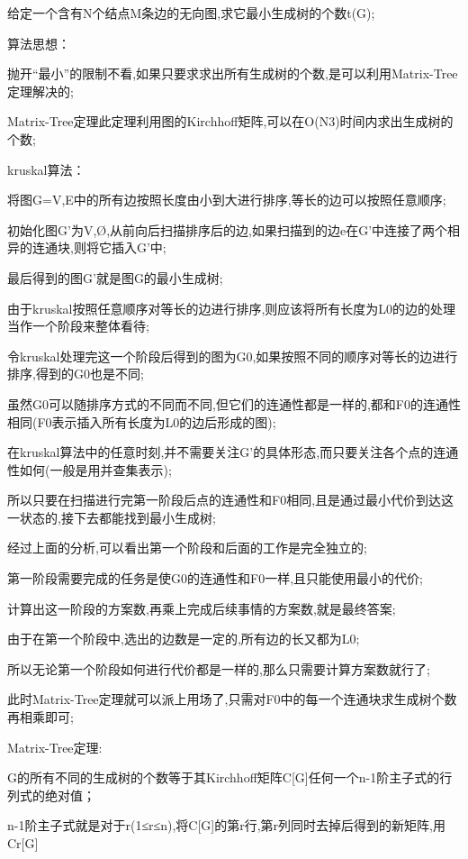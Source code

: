 给定一个含有N个结点M条边的无向图,求它最小生成树的个数t(G);

算法思想：

抛开“最小”的限制不看,如果只要求求出所有生成树的个数,是可以利用Matrix-Tree定理解决的;

Matrix-Tree定理此定理利用图的Kirchhoff矩阵,可以在O(N3)时间内求出生成树的个数;

kruskal算法：

将图G={V,E}中的所有边按照长度由小到大进行排序,等长的边可以按照任意顺序;

初始化图G’为{V,Ø},从前向后扫描排序后的边,如果扫描到的边e在G’中连接了两个相异的连通块,则将它插入G’中;

最后得到的图G’就是图G的最小生成树;

由于kruskal按照任意顺序对等长的边进行排序,则应该将所有长度为L0的边的处理当作一个阶段来整体看待;

令kruskal处理完这一个阶段后得到的图为G0,如果按照不同的顺序对等长的边进行排序,得到的G0也是不同;

虽然G0可以随排序方式的不同而不同,但它们的连通性都是一样的,都和F0的连通性相同(F0表示插入所有长度为L0的边后形成的图);

在kruskal算法中的任意时刻,并不需要关注G’的具体形态,而只要关注各个点的连通性如何(一般是用并查集表示);

所以只要在扫描进行完第一阶段后点的连通性和F0相同,且是通过最小代价到达这一状态的,接下去都能找到最小生成树;

经过上面的分析,可以看出第一个阶段和后面的工作是完全独立的;

第一阶段需要完成的任务是使G0的连通性和F0一样,且只能使用最小的代价;

计算出这一阶段的方案数,再乘上完成后续事情的方案数,就是最终答案;

由于在第一个阶段中,选出的边数是一定的,所有边的长又都为L0;

所以无论第一个阶段如何进行代价都是一样的,那么只需要计算方案数就行了;

此时Matrix-Tree定理就可以派上用场了,只需对F0中的每一个连通块求生成树个数再相乘即可;

Matrix-Tree定理:

G的所有不同的生成树的个数等于其Kirchhoff矩阵C[G]任何一个n-1阶主子式的行列式的绝对值；

n-1阶主子式就是对于r(1≤r≤n),将C[G]的第r行,第r列同时去掉后得到的新矩阵,用Cr[G]

